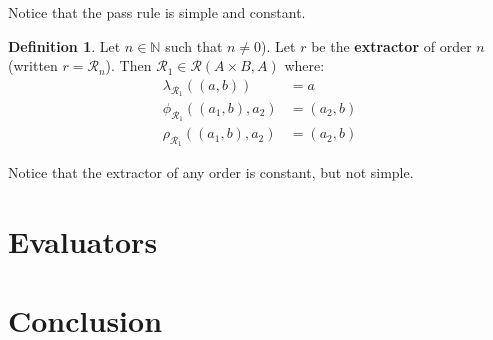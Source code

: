\documentclass{article}
\theoremstyle{definition}
\newtheorem{definition}{Definition}[subsection]
\theoremstyle{plain}
\def\rule{\mathcal{R}}
\begin{document}
Notice that the pass rule is simple and constant.

\begin{definition}
  Let $ n \in \mathbb{N} $ such that $ n \neq 0 $).
  Let $ r $ be the \textbf{extractor} of order $ n $
  (written $ r = \rule_n $).
  Then $ \rule_1 \in \rule (A \times B, A) $ where:
  \begin{align}
    \lambda_{\rule_1} ((a, b))        & = {a} \\
       \phi_{\rule_1} ((a_1, b), a_2) & = (a_2, b) \\
       \rho_{\rule_1} ((a_1, b), a_2) & = (a_2, b)
  \end{align}
\end{definition}

Notice that the extractor of any order is constant, but not simple.

\section{Evaluators}

\section{Conclusion}
\end{document}
